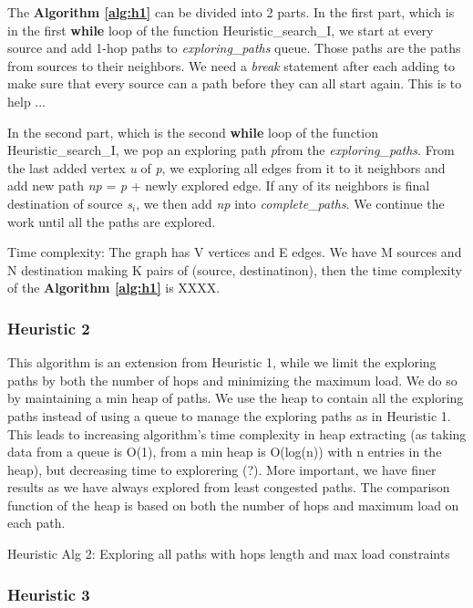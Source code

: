 The \textbf{Algorithm \ref{alg:h1}} can be divided into 2 parts. In the first part, which is in the first \textbf{while} loop of the function Heuristic\_search\_I, we start at every source and add 1-hop paths to \textit{exploring\_paths} queue. Those paths are the paths from sources to their neighbors. We need a \textit{break} statement after each adding to make sure that every source can a path before they can all start again. This is to help ...

In the second part, which is the second \textbf{while} loop of the function Heuristic\_search\_I, we pop an exploring path \textit{p}from the \textit{exploring\_paths}. From the last added vertex \textit{u} of \textit{p}, we exploring all edges from it to it neighbors and add new path \textit{np} = \textit{p} + newly explored edge. If any of its neighbors is final destination of source \textit{s$_i$}, we then add \textit{np} into \textit{complete\_paths}. We continue the work until all the paths are explored.

Time complexity: The graph has V vertices and E edges. We have M sources and N destination making K pairs of (source, destinatinon), then the time complexity of the \textbf{Algorithm \ref{alg:h1}} is XXXX.

\subsubsection{Heuristic 2}
This algorithm is an extension from Heuristic 1, while we limit the exploring paths by both the number of hops and minimizing the maximum load. We do so by maintaining a min heap of paths. We use the heap to contain all the exploring paths instead of using a queue to manage the exploring paths as in Heuristic 1. This leads to increasing algorithm's time complexity in heap extracting (as taking data from a queue is O(1), from a min heap is O(log(n)) with n entries in the heap), but decreasing time to explorering (?). More important, we have finer results as we have always explored from least congested paths. The comparison function of the heap is based on both the number of hops and maximum load on each path. 

\begin{algorithm}

\caption{Heuristic Alg 2: Exploring all paths with hops length and max load constraints}
\label{alg:h2}
\end{algorithm}

\subsubsection{Heuristic 3}

